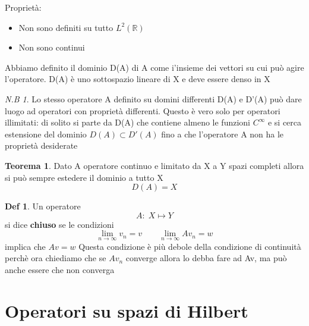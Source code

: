 \documentclass[a4paper,11pt]{report}
\theoremstyle{remark}
\newtheorem*{nb}{N.B}
\theoremstyle{definition}
\newtheorem*{teo}{Teorema}
\newtheorem*{Def}{Def}
\newcommand{\R}{\mathbb{R}}
\begin{document}
Proprietà:

\begin{itemize}
	\item Non sono definiti su tutto $L^2(\R)$
	\item Non sono continui
\end{itemize}

\noindent Abbiamo definito il dominio D(A) di A come i'insieme dei vettori su cui può agire l'operatore.
D(A) è uno sottospazio lineare di X e deve essere denso in X

\begin{nb}
	Lo stesso operatore A definito su domini differenti D(A) e D'(A) può dare luogo ad operatori con proprietà differenti. Questo è vero solo per operatori illimitati: di solito si parte da D(A) che contiene almeno le funzioni $C^\infty$ e si cerca estensione del dominio $D(A) \subset D'(A)$ fino a che l'operatore A non ha le proprietà desiderate
\end{nb}

\begin{teo}
	Dato A operatore continuo e limitato da X a Y spazi completi allora si può sempre estedere il dominio a tutto X
	\begin{equation*}
		D(A) = X
	\end{equation*}
\end{teo}

\begin{Def}
	Un operatore 
	\begin{equation*}
		A: \; X \mapsto Y
	\end{equation*}
	si dice \textbf{chiuso} se le condizioni
	\begin{equation*}
		\lim_{n\to\infty} v_n = v \qquad \lim_{n\to\infty} Av_n = w
	\end{equation*}
	implica che $Av = w$ \newline
	Questa condizione è più debole della condizione di continuità perchè ora chiediamo che se $Av_n$ converge  allora lo debba fare ad Av, ma può anche essere che non converga
\end{Def}

\chapter{Operatori su spazi di Hilbert}
\end{document}
